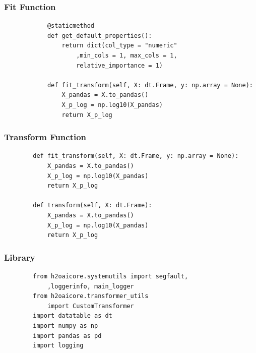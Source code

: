 \documentclass[11pt,
aspectratio=169,
hyperref={colorlinks}
]{beamer}
\begin{document}
\begin{frame}[fragile]
        \frametitle{Fit Function}
        \begin{verbatim}
            @staticmethod
            def get_default_properties():
                return dict(col_type = "numeric"
                    ,min_cols = 1, max_cols = 1,
                    relative_importance = 1)

            def fit_transform(self, X: dt.Frame, y: np.array = None):
                X_pandas = X.to_pandas()
                X_p_log = np.log10(X_pandas)
                return X_p_log
        \end{verbatim}
\end{frame}
\begin{frame}[fragile]
        \frametitle{Transform Function}
        \begin{verbatim}
        def fit_transform(self, X: dt.Frame, y: np.array = None):
            X_pandas = X.to_pandas()
            X_p_log = np.log10(X_pandas)
            return X_p_log

        def transform(self, X: dt.Frame):
            X_pandas = X.to_pandas()
            X_p_log = np.log10(X_pandas)
            return X_p_log
        \end{verbatim}
\end{frame}
\begin{frame}[fragile]
        \frametitle{Library}
        \begin{verbatim}
        from h2oaicore.systemutils import segfault, 
            ,loggerinfo, main_logger
        from h2oaicore.transformer_utils 
            import CustomTransformer
        import datatable as dt
        import numpy as np
        import pandas as pd
        import logging
        \end{verbatim}
\end{frame}
\end{document}
